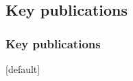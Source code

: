 \subsection{Key publications}
\begin{frame}[allowframebreaks] %
    \frametitle{Key publications}

[default]
\scriptsize
\begin{enumerate}
 \justifying


\end{enumerate}
\end{frame}
